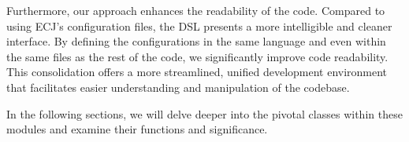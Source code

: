     Furthermore, our approach enhances the readability of the code.
    Compared to using ECJ's configuration files, the DSL presents a more 
    intelligible and cleaner interface.
    By defining the configurations in the same language and even within the 
    same files as the rest of the code, we significantly improve code 
    readability.
    This consolidation offers a more streamlined, unified development 
    environment that facilitates easier understanding and manipulation of the 
    codebase.

    In the following sections, we will delve deeper into the pivotal classes within these modules and examine their functions and significance.
